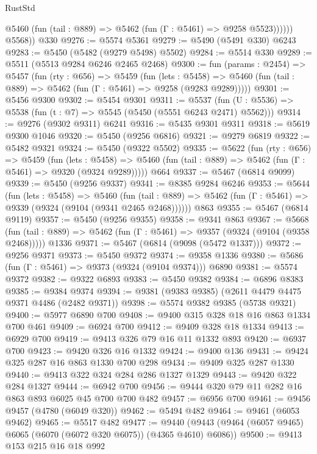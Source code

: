 \begin{lexlean}{RustStd}
\begin{coremodule}
              @5460 (fun (tail : @889) => @5462 (fun (Γ : @5461) => @9258 @5523))))))
        @5568))
    @330
@9276 := @5574 @5361
@9279 := @5490 (@5491 @330) @6243
@9283 := @5450 (@5482 (@9279 @5498) @5502)
@9284 := @5514 @330
@9289 := @5511 (@5513 @9284 @6246 @2465 @2468)
@9300 := fun (params : @2454) =>
  @5457
    (fun (rty : @656) =>
    @5459
      (fun (lets : @5458) =>
      @5460 (fun (tail : @889) => @5462 (fun (Γ : @5461) => @9258 (@9283 @9289)))))
@9301 := @5456 @9300
@9302 := @5454 @9301
@9311 := @5537 (fun (U : @5536) => @5538 (fun (t : @7) => @5545 (@5450 (@5551 @6243 @2471) @5562)))
@9314 := @9276 (@9302 @9311) @6241
@9316 := @5435 @9301 @9311
@9318 := @5619 @9300 @1046
@9320 := @5450 (@9256 @6816)
@9321 := @9279 @6819
@9322 := @5482 @9321
@9324 := @5450 (@9322 @5502)
@9335 := @5622
    (fun (rty : @656) =>
    @5459
      (fun (lets : @5458) =>
      @5460 (fun (tail : @889) => @5462 (fun (Γ : @5461) => @9320 (@9324 @9289)))))
    @664
@9337 := @5467 (@6814 @9099)
@9339 := @5450 (@9256 @9337)
@9341 := @8385 @9284 @6246
@9353 := @5644
    (fun (lets : @5458) =>
    @5460
      (fun (tail : @889) => @5462 (fun (Γ : @5461) => @9339 (@9324 (@9104 (@9341 @2465 @2468))))))
    @863
@9355 := @5467 (@6814 @9119)
@9357 := @5450 (@9256 @9355)
@9358 := @9341 @863
@9367 := @5668
    (fun (tail : @889) => @5462 (fun (Γ : @5461) => @9357 (@9324 (@9104 (@9358 @2468)))))
    @1336
@9371 := @5467 (@6814 (@9098 (@5472 @1337)))
@9372 := @9256 @9371
@9373 := @5450 @9372
@9374 := @9358 @1336
@9380 := @5686 (fun (Γ : @5461) => @9373 (@9324 (@9104 @9374))) @6890
@9381 := @5574 @9372
@9382 := @9322 @6893
@9383 := @5450 @9382
@9384 := @6896 @8383
@9385 := @9384 @9374
@9394 := @9381 (@9383 @9385) (@2611 @4479 @4475 @9371 @4486 (@2482 @9371))
@9398 := @5574 @9382 @9385 (@5738 @9321)
@9400 := @5977 @6890 @700
@9408 := @9400 @315 @328 @18 @16 @863 @1334 @700 @461
@9409 := @6924 @700
@9412 := @9409 @328 @18 @1334
@9413 := @6929 @700
@9419 := @9413 @326 @79 @16 @11 @1332 @893
@9420 := @6937 @700
@9423 := @9420 @326 @16 @1332
@9424 := @9400 @136
@9431 := @9424 @325 @287 @16 @863 @1330 @700 @298
@9434 := @9409 @325 @287 @1330
@9440 := @9413 @322 @324 @284 @286 @1327 @1329
@9443 := @9420 @322 @284 @1327
@9444 := @6942 @700
@9456 := @9444 @320 @79 @11 @282 @16 @863 @893 @6025 @45 @700 @700 @482
@9457 := @6956 @700
@9461 := @9456 @9457 (@4780 (@6049 @320))
@9462 := @5494 @482
@9464 := @9461 (@6053 @9462)
@9465 := @5517 @482
@9477 := @9440 (@9443 (@9464 (@6057 @9465) @6065 (@6070 (@6072 @320 @6075)) (@4365 @4610) @6086))
@9500 := @9413
    @153
    @215
    @16
    @18
    @992

\end{coremodule}
\end{lexlean}
